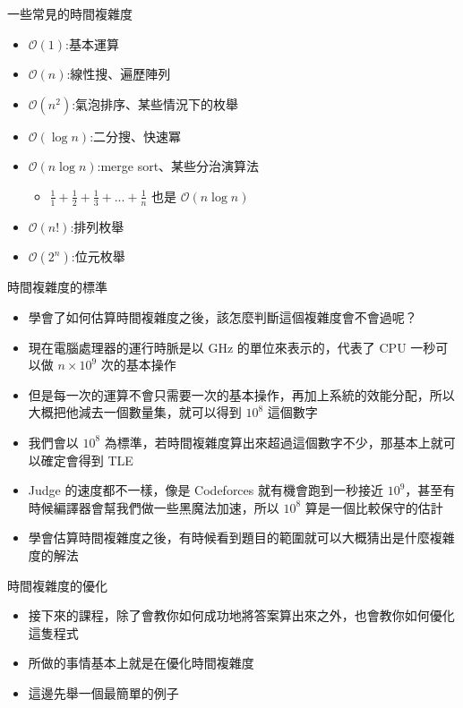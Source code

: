\documentclass[aspectratio=169]{beamer}
\begin{document}
	\begin{frame}{一些常見的時間複雜度}
		\begin{itemize}
			\item $\mathcal{O}(1)$:基本運算
			\item $\mathcal{O}(n)$:線性搜、遍歷陣列
			\item $\mathcal{O}(n^2)$:氣泡排序、某些情況下的枚舉
			\item $\mathcal{O}(\log n)$:二分搜、快速冪
			\item $\mathcal{O}(n\log n)$:merge sort、某些分治演算法
				\begin{itemize}
					\item $\frac{1}{1}+\frac{1}{2}+\frac{1}{3}+...+\frac{1}{n}$ 也是 $\mathcal{O}(n \log n)$
				\end{itemize}
			\item $\mathcal{O}(n!)$:排列枚舉
			\item $\mathcal{O}(2^n)$:位元枚舉
		\end{itemize}
	\end{frame}

	\begin{frame}{時間複雜度的標準}
		\begin{itemize}
			\item<1-> 學會了如何估算時間複雜度之後，該怎麼判斷這個複雜度會不會過呢？
			\item<2-> 現在電腦處理器的運行時脈是以 GHz 的單位來表示的，代表了 CPU 一秒可以做 $n \times 10^9$ 次的基本操作
			\item<3-> 但是每一次的運算不會只需要一次的基本操作，再加上系統的效能分配，所以大概把他減去一個數量集，就可以得到 $10^8$ 這個數字
			\item<4-> 我們會以 $10^8$ 為標準，若時間複雜度算出來超過這個數字不少，那基本上就可以確定會得到 TLE
			\item<5-> Judge 的速度都不一樣，像是 Codeforces 就有機會跑到一秒接近 $10^9$，甚至有時候編譯器會幫我們做一些黑魔法加速，所以 $10^8$ 算是一個比較保守的估計
			\item<6-> 學會估算時間複雜度之後，有時候看到題目的範圍就可以大概猜出是什麼複雜度的解法
		\end{itemize}
	\end{frame}

	\begin{frame}{時間複雜度的優化}
		\begin{itemize}
			\item<1-> 接下來的課程，除了會教你如何成功地將答案算出來之外，也會教你如何優化這隻程式
			\item<2-> 所做的事情基本上就是在優化時間複雜度
			\item<3-> 這邊先舉一個最簡單的例子
		\end{itemize}
	\end{frame}
\end{document}
